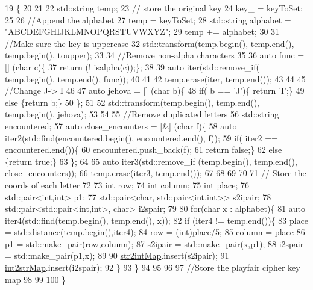 \begin{DoxyCode}
19                                              \{
20 
21  
22   std::string temp;
23   \textcolor{comment}{// store the original key}
24   key\_ = keyToSet;
25 
26   \textcolor{comment}{//Append the alphabet}
27   temp = keyToSet;
28   std::string alphabet = \textcolor{stringliteral}{"ABCDEFGHIJKLMNOPQRSTUVWXYZ"};
29   temp += alphabet;
30 
31   \textcolor{comment}{//Make sure the key is uppercase}
32   std::transform(temp.begin(), temp.end(), temp.begin(), toupper);
33   
34   \textcolor{comment}{//Remove non-alpha characters}
35  
36   \textcolor{keyword}{auto} func = [] (\textcolor{keywordtype}{char} c)\{
37     \textcolor{keywordflow}{return} (! isalpha(c));\};
38   
39   \textcolor{keyword}{auto} iter(std::remove\_if( temp.begin(), temp.end(), func));
40 
41 
42  temp.erase(iter, temp.end());
43 
44 
45   \textcolor{comment}{//Change J-> I}
46 
47   \textcolor{keyword}{auto} jehova = [] (\textcolor{keywordtype}{char} b)\{
48     \textcolor{keywordflow}{if}( b == \textcolor{charliteral}{'J'})\{ \textcolor{keywordflow}{return} \textcolor{charliteral}{'I'};\}
49     \textcolor{keywordflow}{else} \{\textcolor{keywordflow}{return} b;\}
50   \};
51 
52   std::transform(temp.begin(), temp.end(), temp.begin(), jehova);
53   
54 
55   \textcolor{comment}{//Remove duplicated letters}
56 std::string encountered;
57 \textcolor{keyword}{auto} close\_encounters = [&] (\textcolor{keywordtype}{char} f)\{
58   \textcolor{keyword}{auto} iter2(std::find(encountered.begin(), encountered.end(), f));
59          \textcolor{keywordflow}{if}( iter2 == encountered.end())\{
60            encountered.push\_back(f);
61            \textcolor{keywordflow}{return} \textcolor{keyword}{false};\}
62          \textcolor{keywordflow}{else} \{\textcolor{keywordflow}{return} \textcolor{keyword}{true};\}
63          \};
64 
65   \textcolor{keyword}{auto} iter3(std::remove\_if (temp.begin(), temp.end(), close\_encounters));
66   temp.erase(iter3, temp.end());
67   
68 
69   
70 
71   \textcolor{comment}{// Store the coords of each letter}
72 
73    \textcolor{keywordtype}{int} row;
74   \textcolor{keywordtype}{int} column;
75   \textcolor{keywordtype}{int} place;
76   std::pair<int,int> p1;
77   std::pair<char, std::pair<int,int>> s2ipair;
78   std::pair<std::pair<int,int>, \textcolor{keywordtype}{char}> i2spair;
79   
80   \textcolor{keywordflow}{for}(\textcolor{keywordtype}{char} x : alphabet)\{
81     \textcolor{keyword}{auto} iter4(std::find(temp.begin(), temp.end(), x));
82     \textcolor{keywordflow}{if} (iter4 != temp.end())\{
83       place = std::distance(temp.begin(),iter4);
84       row = (int)place/5;
85       column = place%
86       p1 = std::make\_pair(row,column);
87       s2ipair = std::make\_pair(x,p1);
88       i2spair = std::make\_pair(p1,x);
89 
90       \hyperlink{class_playfair_cipher_a3171ced3a7a56d8fcf57e99d760db715}{str2intMap}.insert(s2ipair);
91       \hyperlink{class_playfair_cipher_ac02d4eb28101423fe0b9b5313c0b9cd5}{int2strMap}.insert(i2spair);
92     \}
93   \}
94 
95   
96 
97   \textcolor{comment}{//Store the playfair cipher key map}
98 
99  
100 \}
\end{DoxyCode}


